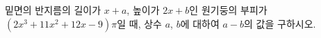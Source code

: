 밑면의 반지름의 길이가 $x+a$, 높이가 $2x+b$인 원기둥의 부피가 $(2x^3+11x^2+12x-9)\pi$일 때, 상수 $a$, $b$에 대하여 $a-b$의 값을 구하시오.
